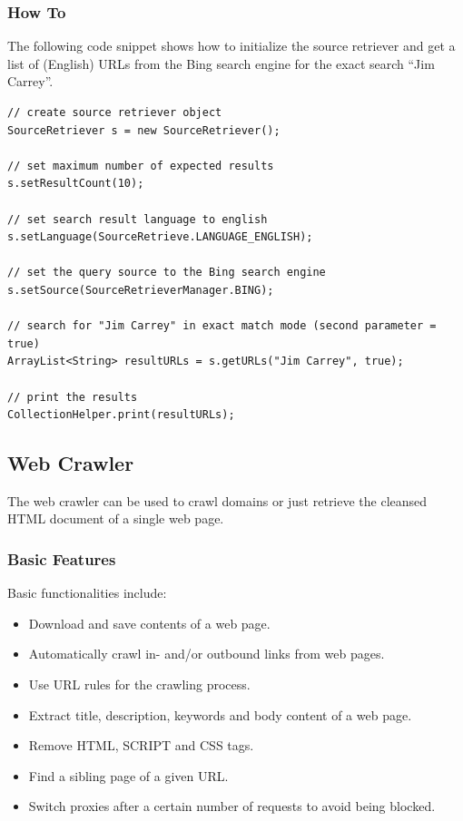\documentclass[a4paper,twoside]{article}      %
\begin{document}
\subsubsection{How To}
\label{sec:howto}
The following code snippet shows how to initialize the source retriever and get a list of (English) URLs from the Bing search engine for the exact search ``Jim Carrey''.
\begin{codelisting}
\begin{lstlisting}[frame=tb]
// create source retriever object
SourceRetriever s = new SourceRetriever();
		
// set maximum number of expected results 
s.setResultCount(10);
		
// set search result language to english
s.setLanguage(SourceRetrieve.LANGUAGE_ENGLISH);
		
// set the query source to the Bing search engine 
s.setSource(SourceRetrieverManager.BING);
		
// search for "Jim Carrey" in exact match mode (second parameter = true)
ArrayList<String> resultURLs = s.getURLs("Jim Carrey", true);
		
// print the results
CollectionHelper.print(resultURLs);	
\end{lstlisting}
\end{codelisting}


\subsection{Web Crawler}
The web crawler can be used to crawl domains or just retrieve the cleansed HTML document of a single web page.

\subsubsection{Basic Features}
Basic functionalities include:
\begin{itemize}
\item Download and save contents of a web page.
\item Automatically crawl in- and/or outbound links from web pages.
\item Use URL rules for the crawling process.
\item Extract title, description, keywords and body content of a web page.
\item Remove HTML, SCRIPT and CSS tags.
\item Find a sibling page of a given URL.
\item Switch proxies after a certain number of requests to avoid being blocked.
\end{itemize}
\end{document}

